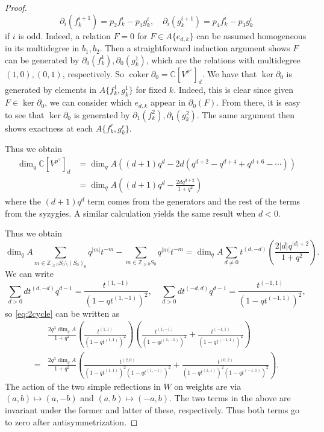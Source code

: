 \documentclass[12pt]{article}
\newcommand{\Z}{\mathbb{Z}}
\newcommand{\C}{\mathbb{C}}
\DeclareMathOperator{\coker}{coker}
\theoremstyle{definition}
\theoremstyle{remark}
\begin{document}
\begin{proof}
    \[\partial_i(f_k^{i+1})=p_2f_k^i-p_1g_k^i,\quad\partial_i(g_k^{i+1})=p_4f_k^i-p_3g_k^i\]
    if $i$ is odd. Indeed, a relation $F=0$ for $F\in A\{e_{d,k}\}$ can be assumed homogeneous in its multidegree in $b_1,b_2$. Then a straightforward induction argument shows $F$ can be generated by $\partial_0(f_k^1),\partial_0(g_k^1)$, which are the relations with multidegree $(1,0),(0,1)$, respectively. So $\coker\partial_0=\C[V^{\rho^\vee}]_d$. We have that $\ker\partial_0$ is generated by elements in $A\{f_k^1,g_k^1\}$ for fixed $k$. Indeed, this is clear since given $F\in\ker\partial_0$, we can consider which $e_{d,k}$ appear in $\partial_0(F)$. From there, it is easy to see that $\ker\partial_0$ is generated by $\partial_1(f_k^2),\partial_1(g_k^2)$. The same argument then shows exactness at each $A\{f_k^r,g_k^r\}$.
    
    Thus we obtain
    \begin{align*}
        \dim_q\C[V^{\rho^\vee}]_d&=\dim_qA\left((d+1)q^d-2d(q^{d+2}-q^{d+4}+q^{d+6}-\cdots)\right)\\
        &=\dim_qA\left((d+1)q^d-\frac{2dq^{d+2}}{1+q^2}\right)
    \end{align*}
    where the $(d+1)q^d$ term comes from the generators and the rest of the terms from the syzygies. A similar calculation yields the same result when $d<0$.

    Thus we obtain
    \[\dim_qA\sum_{m\in\Z_{\geq 0}S_0\setminus(S_0)_0}q^{|m|}t^{-m}-\sum_{m\in\Z_{\geq 0}S_0}q^{|m|}t^{-m}=\dim_qA\sum_{d\neq 0}t^{(d,-d)}\left(\frac{2|d|q^{|d|+2}}{1+q^2}\right).\]
    We can write
    \[\sum_{d>0}dt^{(d,-d)}q^{d-1}=\frac{t^{(1,-1)}}{(1-qt^{(1,-1)})^2},\quad\sum_{d>0}dt^{(-d,d)}q^{d-1}=\frac{t^{(-1,1)}}{(1-qt^{(-1,1)})^2},\]
    so \eqref{eq:2cycle} can be written as
    \begin{align*}
        &\frac{2q^3\dim_qA}{1+q^2}\left(\frac{t^{(1,1)}}{(1-qt^{(1,1)})^2}\right)\left(\frac{t^{(1,-1)}}{(1-qt^{(1,-1)})^2}+\frac{t^{(-1,1)}}{(1-qt^{(-1,1)})^2}\right)\\
        =&\frac{2q^3\dim_qA}{1+q^2}\left(\frac{t^{(2,0)}}{(1-qt^{(1,1)})^2(1-qt^{(1,-1)})^2}+\frac{t^{(0,2)}}{(1-qt^{(1,1)})^2(1-qt^{(-1,1)})^2}\right).
    \end{align*}
    The action of the two simple reflections in $W$ on weights are via $(a,b)\mapsto(a,-b)$ and $(a,b)\mapsto(-a,b)$. The two terms in the above are invariant under the former and latter of these, respectively. Thus both terms go to zero after antisymmetrization.
\end{proof}
\end{document}
